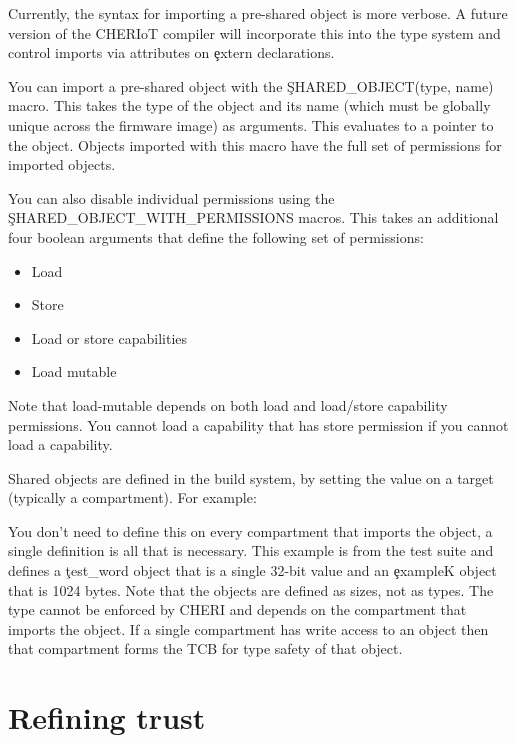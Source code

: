 Currently, the syntax for importing a pre-shared object is more verbose. A future version of the CHERIoT compiler will incorporate this into the type system and control imports via attributes on \c{extern} declarations.

You can import a pre-shared object with the \c{SHARED_OBJECT(type, name)} macro.
This takes the type of the object and its name (which must be globally unique across the firmware image) as arguments.
This evaluates to a pointer to the object.
Objects imported with this macro have the full set of permissions for imported objects.

You can also disable individual permissions using the \c{SHARED_OBJECT_WITH_PERMISSIONS} macros.
This takes an additional four boolean arguments that define the following set of permissions:

\begin{itemize}
	\item{Load}
	\item{Store}
	\item{Load or store capabilities}
	\item{Load mutable}
\end{itemize}

Note that load-mutable depends on both load and load/store capability permissions.
You cannot load a capability that has store permission if you cannot load a capability.

Shared objects are defined in the build system, by setting the  value on a target (typically a compartment).
For example:

\begin{luasnippet}
    on_load(function(target)
        target:values_set("shared_objects", { exampleK = 1024, test_word = 4 \}, {expand = false\})
    end)
\end{luasnippet}

You don't need to define this on every compartment that imports the object, a single definition is all that is necessary.
This example is from the test suite and defines a \c{test_word} object that is a single 32-bit value and an \c{exampleK} object that is 1024 bytes.
Note that the objects are defined as sizes, not as types.
The type cannot be enforced by CHERI and depends on the compartment that imports the object.
If a single compartment has write access to an object then that compartment forms the TCB for type safety of that object.

\section{Refining trust}

